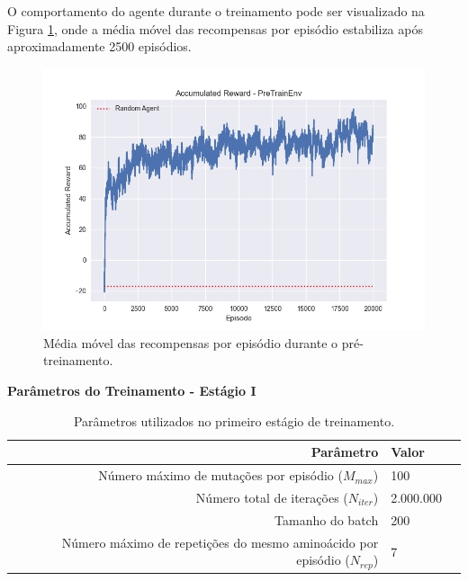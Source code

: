 O comportamento do agente durante o treinamento pode ser visualizado na Figura \ref{fig:rew_per_ep_pretrain}, onde a média móvel das recompensas por episódio estabiliza após aproximadamente 2500 episódios.

\begin{figure}[H]
  \centering
  \includegraphics[width=.8\linewidth]{figuras/plot_pre_train_reward.jpg}    
  \caption{Média móvel das recompensas por episódio durante o pré-treinamento.}
  \label{fig:rew_per_ep_pretrain}
\end{figure}

\textbf{Parâmetros do Treinamento - Estágio I}
\begin{table}[H]
  \centering
  \vspace{0.5cm}
  \begin{tabular}{r|lr}
  \textbf{Parâmetro} & \textbf{Valor} \\ 
  \hline
  Número máximo de mutações por episódio ($M_{max}$) & 100 \\
  Número total de iterações ($N_{iter}$) & 2.000.000 \\
  Tamanho do batch & 200 \\
  Número máximo de repetições do mesmo aminoácido por episódio ($N_{rep}$) & 7 \\
  \end{tabular}
  \caption{Parâmetros utilizados no primeiro estágio de treinamento.}
  \label{tab:params_train_stage1}
\end{table}
